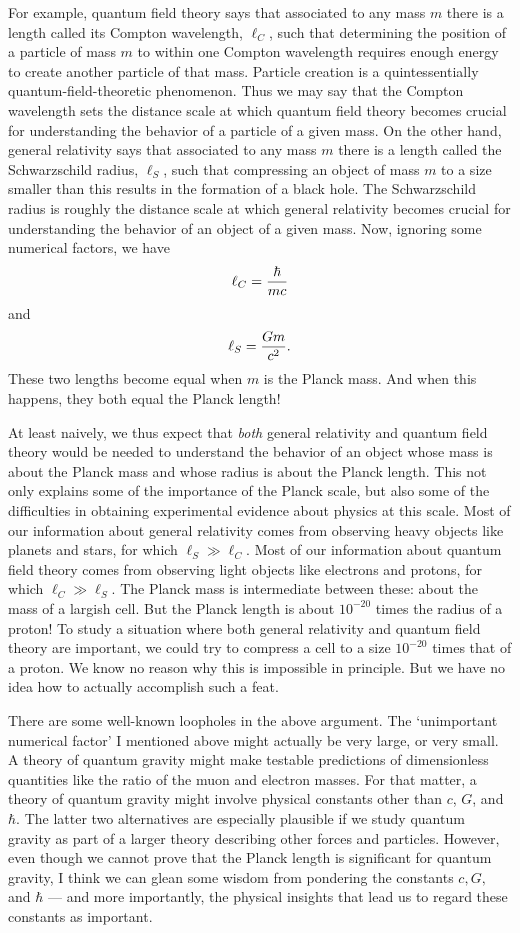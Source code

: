 For example, quantum field theory says that associated to any mass $m$
there is a length called its Compton wavelength, $\ell_C$, such that
determining the position of a particle of mass $m$ to within one Compton
wavelength requires enough energy to create another particle of that
mass.  Particle creation is a quintessentially quantum-field-theoretic
phenomenon.  Thus we may say that the Compton wavelength sets the
distance scale at which quantum field theory becomes crucial for
understanding the behavior of a particle of a given mass.  On the other
hand, general relativity says that associated to any mass $m$ there is a
length called the Schwarzschild radius, $\ell_S$, such that compressing
an object of mass $m$ to a size smaller than this results in the
formation of a black hole.  The Schwarzschild radius is roughly the
distance scale at which general relativity becomes crucial for
understanding the behavior of an object of a given mass.  Now, ignoring
some numerical factors, we have   
\[       \ell_C = {\hbar \over mc}  \]   
and  
\[       \ell_S = {Gm\over c^2}. \]   
These two lengths become equal when $m$ is the Planck mass.  And 
when this happens, they both equal the Planck length!

At least naively, we thus expect that {\it both} general relativity and
quantum field theory would be needed to understand the behavior of an
object whose mass is about the Planck mass and whose radius is about the
Planck length.  This not only explains some of the importance of the
Planck scale, but also some of the difficulties in obtaining
experimental evidence about physics at this scale.  Most of our
information about general relativity comes from observing heavy objects
like planets and stars, for which $\ell_S \gg \ell_C$.   Most of our
information about quantum field theory comes from observing light
objects like electrons and protons, for which $\ell_C \gg \ell_S$.  The
Planck mass is intermediate between these: about the mass of a largish
cell.  But the Planck length is about $10^{-20}$ times
the radius of a proton!   To study a situation where both general
relativity and quantum field theory are important, we could try to
compress a cell to a size $10^{-20}$ times that of a proton.   We
know no reason why this is impossible in principle.  But we have no idea
how to actually accomplish such a feat.  

There are some well-known loopholes in the above argument.   The
`unimportant numerical factor' I mentioned above might actually be very
large, or very small.  A theory of quantum gravity might make testable
predictions of dimensionless quantities like the ratio of the muon and
electron masses.  For that matter, a theory of quantum gravity might
involve physical constants other than $c$, $G$,  and $\hbar$.  The
latter two alternatives are especially plausible if we study quantum
gravity as part of a larger theory describing other forces and
particles.   However, even though we cannot prove that the Planck length
is significant for quantum gravity, I think we can glean some wisdom
from pondering the constants $c,G,$ and $\hbar$ --- and more
importantly, the physical insights that lead us to regard these
constants as important.

